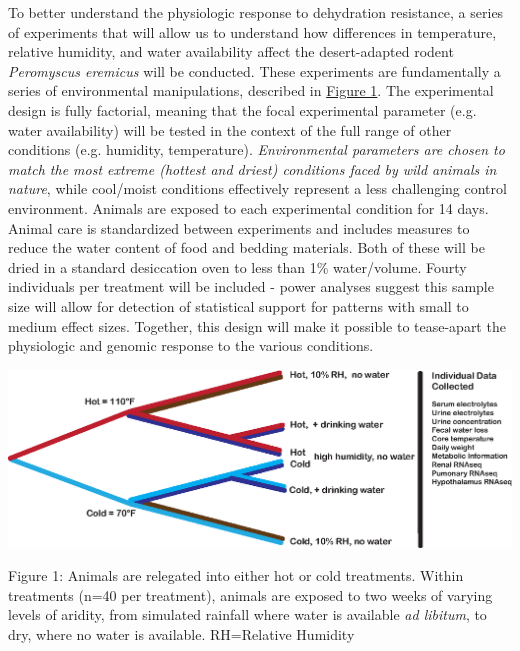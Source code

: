 \documentclass[11pt]{article}
\begin{document}
To better understand the physiologic response to dehydration resistance, a series of experiments that will allow us to understand how differences in temperature, relative humidity, and water availability affect the desert-adapted rodent \textit{Peromyscus eremicus} will be conducted. These experiments are fundamentally a series of environmental manipulations, described in \hyperlink{Figure 1}{Figure 1}. The experimental design is fully factorial, meaning that the focal experimental parameter (e.g. water availability) will be tested in the context of the full range of other conditions (e.g. humidity, temperature). \emph{Environmental parameters are chosen to match the most extreme (hottest and driest) conditions faced by wild animals in nature}, while cool/moist conditions effectively represent a less challenging control environment. Animals are exposed to each experimental condition for 14 days. Animal care is standardized between experiments and includes measures to reduce the water content of food and bedding materials. Both of these will be dried in a standard desiccation oven to less than 1\% water/volume. Fourty individuals per treatment will be included - power analyses suggest this sample size will allow for detection of statistical support for patterns with small to medium effect sizes. Together, this design will make it possible to tease-apart the physiologic and genomic response to the various conditions. \\

\vspace{2mm}

\begin{mdframed}
 \begin{center}
  \includegraphics[width=1\textwidth]{exp_design_fig.eps}
 \end{center} 

\noindent \small{Figure 1: Animals are relegated into either hot or cold treatments. Within treatments (n=40 per treatment), animals are exposed to two weeks of varying levels of aridity, from simulated rainfall where water is available \textit{ad libitum}, to dry, where no water is available. RH=Relative Humidity}

\end{mdframed}
\end{document}
